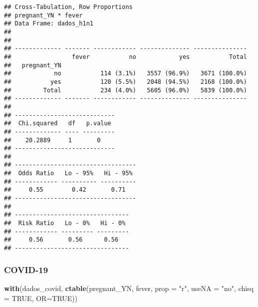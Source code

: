 \documentclass[
]{article}
\newenvironment{Shaded}{\begin{snugshade}}{\end{snugshade}}
\newcommand{\DataTypeTok}[1]{\textcolor[rgb]{0.13,0.29,0.53}{#1}}
\newcommand{\DecValTok}[1]{\textcolor[rgb]{0.00,0.00,0.81}{#1}}
\newcommand{\KeywordTok}[1]{\textcolor[rgb]{0.13,0.29,0.53}{\textbf{#1}}}
\newcommand{\NormalTok}[1]{#1}
\newcommand{\OperatorTok}[1]{\textcolor[rgb]{0.81,0.36,0.00}{\textbf{#1}}}
\newcommand{\OtherTok}[1]{\textcolor[rgb]{0.56,0.35,0.01}{#1}}
\newcommand{\StringTok}[1]{\textcolor[rgb]{0.31,0.60,0.02}{#1}}
\begin{document}
\begin{verbatim}
## Cross-Tabulation, Row Proportions  
## pregnant_YN * fever  
## Data Frame: dados_h1n1  
## 
## 
## ------------- ------- ------------ -------------- ---------------
##                 fever           no            yes           Total
##   pregnant_YN                                                    
##            no           114 (3.1%)   3557 (96.9%)   3671 (100.0%)
##           yes           120 (5.5%)   2048 (94.5%)   2168 (100.0%)
##         Total           234 (4.0%)   5605 (96.0%)   5839 (100.0%)
## ------------- ------- ------------ -------------- ---------------
## 
## ----------------------------
##  Chi.squared   df   p.value 
## ------------- ---- ---------
##    20.2889     1       0    
## ----------------------------
## 
## ----------------------------------
##  Odds Ratio   Lo - 95%   Hi - 95% 
## ------------ ---------- ----------
##     0.55        0.42       0.71   
## ----------------------------------
## 
## --------------------------------
##  Risk Ratio   Lo - 0%   Hi - 0% 
## ------------ --------- ---------
##     0.56       0.56      0.56   
## --------------------------------
\end{verbatim}

\hypertarget{covid-19-11}{%
\subsubsection{COVID-19}\label{covid-19-11}}

\begin{Shaded}
\end{Shaded}

\begin{Shaded}
\begin{Highlighting}[]
\KeywordTok{with}\NormalTok{(dados_covid, }\KeywordTok{ctable}\NormalTok{(pregnant_YN, fever, }\DataTypeTok{prop =} \StringTok{"r"}\NormalTok{, }\DataTypeTok{useNA =} \StringTok{"no"}\NormalTok{, }\DataTypeTok{chisq =} \OtherTok{TRUE}\NormalTok{, }\DataTypeTok{OR=}\OtherTok{TRUE}\NormalTok{))}
\end{Highlighting}
\end{Shaded}
\end{document}
